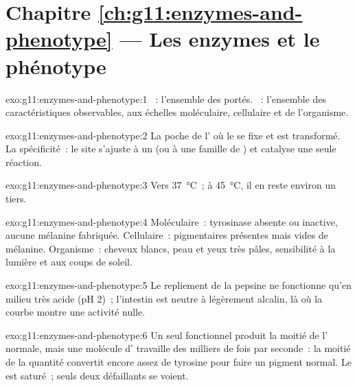 \section*{Chapitre \ref{ch:g11:enzymes-and-phenotype} --- Les enzymes et le phénotype}

\begin{solution}{exo:g11:enzymes-and-phenotype:1}
~: l'ensemble des  portés. ~: l'ensemble des
caractéristiques observables, aux échelles moléculaire, cellulaire et
de l'organisme.
\end{solution}

\begin{solution}{exo:g11:enzymes-and-phenotype:2}
La poche de l' où le  se fixe et est transformé. La
spécificité~: le site s'ajuste à un  (ou à une famille de
) et catalyse une seule réaction.
\end{solution}

\begin{solution}{exo:g11:enzymes-and-phenotype:3}
Vers \qty{37}{\celsius}~; à \qty{45}{\celsius}, il en reste environ un tiers.
\end{solution}

\begin{solution}{exo:g11:enzymes-and-phenotype:4}
Moléculaire~: tyrosinase absente ou inactive, aucune mélanine
fabriquée. Cellulaire~:  pigmentaires présentes mais vides de
mélanine. Organisme~: cheveux blancs, peau et yeux très pâles,
sensibilité à la lumière et aux coups de soleil.
\end{solution}

\begin{solution}{exo:g11:enzymes-and-phenotype:5}
Le repliement de la pepsine ne fonctionne qu'en milieu très acide
(pH 2)~; l'intestin est neutre à légèrement alcalin, là où la courbe
montre une activité nulle.
\end{solution}

\begin{solution}{exo:g11:enzymes-and-phenotype:6}
Un seul  fonctionnel produit la moitié de l' normale, mais
une molécule d' travaille des milliers de fois par seconde~: la
moitié de la quantité convertit encore assez de tyrosine pour faire un
pigment normal. Le  est saturé~; seuls deux 
défaillants se voient.
\end{solution}

